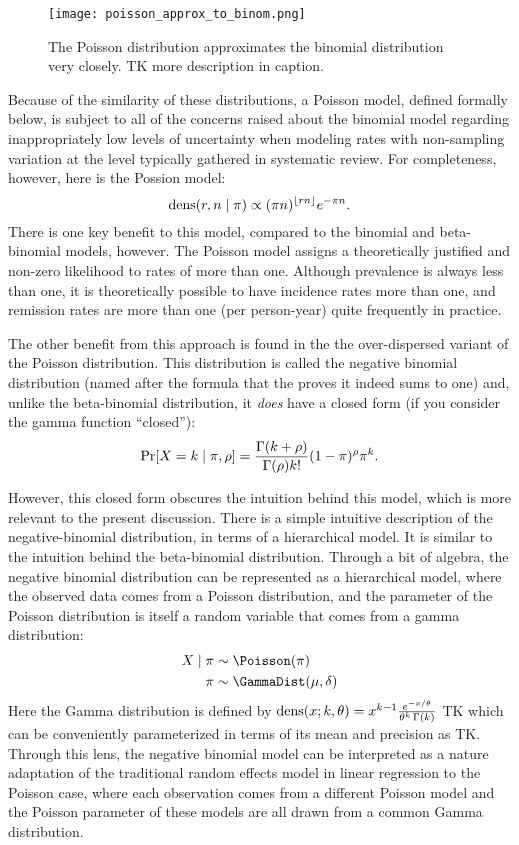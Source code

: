 \begin{figure}
\begin{center}
\texttt{[image: poisson\_approx\_to\_binom.png]}
\end{center}
\caption{The Poisson distribution approximates the binomial distribution very closely. TK more description in caption.}
\label{fig:theory-rate_model-poisson_approx_to_binom}
\end{figure}

Because of the similarity of these distributions, a Poisson model,
defined formally below, is subject to all of the concerns raised about the
binomial model regarding inappropriately low levels of uncertainty
when modeling rates with non-sampling variation at the level typically
gathered in systematic review.  For completeness, however, here is the Possion model:
\[
\operatorname{dens}(r,n\;|\; \pi) \propto (\pi n)^{\lfloor rn\rfloor} e^{-\pi n}.
\]
There is one key benefit to this model, compared to the binomial and
beta-binomial models, however.  The Poisson model assigns a
theoretically justified and non-zero likelihood to rates of more than
one.  Although prevalence is always less than one, it is theoretically
possible to have incidence rates more than one, and remission rates
are more than one (per person-year) quite frequently in practice.

The other benefit from this approach is found in the the
over-dispersed variant of the Poisson distribution.  This distribution
is called the negative binomial distribution (named after the formula
that the proves it indeed sums to one) and, unlike the beta-binomial
distribution, it \emph{does} have a closed form (if you consider the gamma function ``closed''):
\[
\operatorname{Pr}[X = k\;|\; \pi, \rho] = \frac{\Gamma(k+\rho)}{\Gamma(\rho)k!} (1-\pi)^\rho \pi^k.
\]

However, this closed form obscures the intuition behind this model,
which is more relevant to the present discussion.
There is a simple intuitive description of the negative-binomial
distribution, in terms of a hierarchical model.  It is similar to the
intuition behind the beta-binomial distribution. Through a bit of
algebra, the negative binomial distribution can be represented as a
hierarchical model, where the observed data comes from a Poisson
distribution, and the parameter of the Poisson distribution is itself
a random variable that comes from a gamma distribution:
\begin{align*}
X\given \pi &\sim \Poisson(\pi)\\
\pi &\sim \GammaDist(\mu, \delta)
\end{align*}
Here the Gamma distribution is defined by $\operatorname{dens}(x; k,\theta) =
x^{k-1} \frac{e^{-x/\theta}}{\theta^k \, \Gamma(k)}$ TK which can be
conveniently parameterized in terms of its mean and precision as TK.
Through this lens, the negative binomial model can be interpreted as a
nature adaptation of the traditional random effects model in linear
regression to the Poisson case, where each observation comes from a
different Poisson model and the Poisson parameter of these models are
all drawn from a common Gamma distribution.

